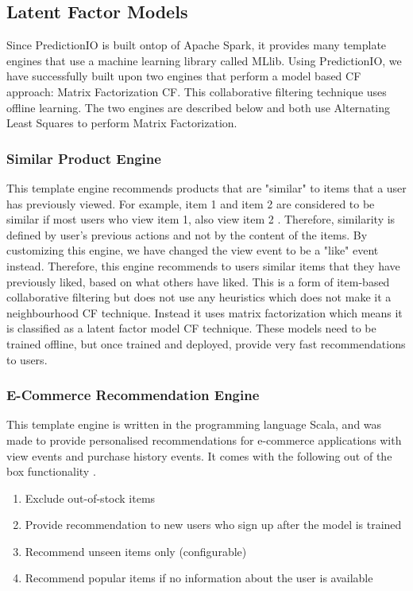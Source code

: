 \subsection{Latent Factor Models}

Since PredictionIO \cite{predictionio} is built ontop of Apache Spark, it provides many template engines that use a machine learning library called MLlib. Using PredictionIO, we have successfully built upon two engines that perform a model based CF approach: Matrix Factorization CF. This collaborative filtering technique uses offline learning. The two engines are described below and both use Alternating Least Squares to perform Matrix Factorization.  

\subsubsection{Similar Product Engine}

This template engine recommends products that are "similar" to items that a user has previously viewed. For example, item 1 and item 2 are considered to be similar if most users who view item 1, also view item 2 \cite{predictionIO}. Therefore, similarity is defined by user's previous actions and not by the content of the items. 
By customizing this engine, we have changed the view event to be a "like" event instead. Therefore, this engine recommends to users similar items that they have previously liked, based on what others have liked. This is a form of item-based collaborative filtering but does not use any heuristics which does not make it a neighbourhood CF technique. Instead it uses matrix factorization which means it is classified as a latent factor model CF technique. These models need to be trained offline, but once trained and deployed, provide very fast recommendations to users. 

\subsubsection{E-Commerce Recommendation Engine}

This template engine is written in the programming language Scala, and was made to provide personalised recommendations for e-commerce applications with view events and purchase history events. It comes with the following out of the box functionality \cite{predictionio}.
\begin{enumerate}
 \item Exclude out-of-stock items
 \item Provide recommendation to new users who sign up after the model is trained
 \item Recommend unseen items only (configurable)
 \item Recommend popular items if no information about the user is available
\end{enumerate}

